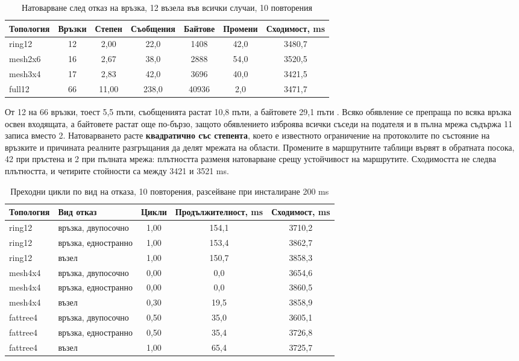 \begin{table}[!htb]
\caption{Натоварване след отказ на връзка, 12 възела във всички случаи, 10 повторения}
\label{tab:flooding}
\centering
\fontsize{10}{12}\selectfont
\begin{spacing}{1.0}
\begin{tabular}{lcccccc}
\toprule
Топология & Връзки & Степен & Съобщения & Байтове & Промени & Сходимост, ms \\
\midrule
ring12   & 12 & 2,00  & 22,0  & 1408   & 42,0 & 3480,7 \\
mesh2x6  & 16 & 2,67  & 38,0  & 2888   & 54,0 & 3520,5 \\
mesh3x4  & 17 & 2,83  & 42,0  & 3696   & 40,0 & 3421,5 \\
full12   & 66 & 11,00 & 238,0 & 40936  &  2,0 & 3471,7 \\
\bottomrule
\end{tabular}
\end{spacing}
\end{table}

От 12 на 66 връзки, тоест 5,5 пъти, съобщенията растат 10,8 пъти, а байтовете 29,1 пъти
. Всяко обявление се препраща по всяка връзка освен входящата, а байтовете
растат още по-бързо, защото обявлението изброява всички съседи на подателя и в пълна мрежа
съдържа 11 записа вместо 2. Натоварването расте \textbf{квадратично със степента}, което е
известното ограничение на протоколите по състояние на връзките и причината реалните разгръщания
да делят мрежата на области. Промените в маршрутните таблици вървят в обратната посока, 42 при
пръстена и 2 при пълната мрежа: плътността разменя натоварване срещу устойчивост на маршрутите.
Сходимостта не следва плътността, и четирите стойности са между 3421 и 3521 ms.

\begin{table}[!htb]
\caption{Преходни цикли по вид на отказа, 10 повторения, разсейване при инсталиране 200 ms}
\label{tab:loops}
\centering
\fontsize{10}{12}\selectfont
\begin{spacing}{1.0}
\begin{tabular}{llccc}
\toprule
Топология & Вид отказ & Цикли & Продължителност, ms & Сходимост, ms \\
\midrule
ring12   & връзка, двупосочно & 1,00 & 154,1 & 3710,2 \\
ring12   & връзка, едностранно & 1,00 & 153,4 & 3862,7 \\
ring12   & възел & 1,00 & 150,7 & 3858,3 \\
mesh4x4  & връзка, двупосочно & 0,00 & 0,0 & 3654,6 \\
mesh4x4  & връзка, едностранно & 0,00 & 0,0 & 3860,5 \\
mesh4x4  & възел & 0,30 & 19,5 & 3858,9 \\
fattree4 & връзка, двупосочно & 0,50 & 35,0 & 3605,1 \\
fattree4 & връзка, едностранно & 0,50 & 35,4 & 3726,8 \\
fattree4 & възел & 1,00 & 65,4 & 3725,7 \\
\bottomrule
\end{tabular}
\end{spacing}
\end{table}

